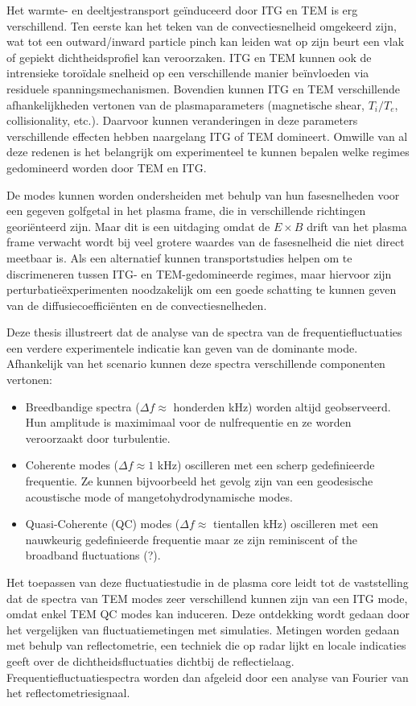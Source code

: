 Het warmte- en deeltjestransport geïnduceerd door ITG en TEM is erg verschillend. Ten eerste kan het teken van de convectiesnelheid omgekeerd zijn, wat tot een outward/inward particle pinch kan leiden wat op zijn beurt een vlak of gepiekt dichtheidsprofiel kan veroorzaken. ITG en TEM kunnen ook de intrensieke toroïdale snelheid op een verschillende manier beïnvloeden via residuele spanningsmechanismen. Bovendien kunnen ITG en TEM verschillende afhankelijkheden vertonen van de plasmaparameters (magnetische shear, $T_i/T_e$, collisionality, etc.). Daarvoor kunnen veranderingen in deze parameters verschillende effecten hebben naargelang ITG of TEM domineert. Omwille van al deze redenen is het belangrijk om experimenteel te kunnen bepalen welke regimes gedomineerd worden door TEM en ITG.

De modes kunnen worden ondersheiden met behulp van hun fasesnelheden voor een gegeven golfgetal in het plasma frame, die in verschillende richtingen georiënteerd zijn. Maar dit is een uitdaging omdat de $E\times B$ drift van het plasma frame verwacht wordt bij veel grotere waardes van de fasesnelheid die niet direct meetbaar is. Als een alternatief kunnen transportstudies helpen om te discrimeneren tussen ITG- en TEM-gedomineerde regimes, maar hiervoor zijn perturbatieëxperimenten noodzakelijk om een goede schatting te kunnen geven van de diffusiecoefficiënten en de convectiesnelheden.

Deze thesis illustreert dat de analyse van de spectra van de frequentiefluctuaties een verdere experimentele indicatie kan geven van de dominante mode. Afhankelijk van het scenario kunnen deze spectra verschillende componenten vertonen:

\begin{itemize}
	\item Breedbandige spectra ($\Delta f\approx$ honderden kHz) worden altijd geobserveerd. Hun amplitude is maximimaal voor de nulfrequentie en ze worden veroorzaakt door turbulentie.
	\item Coherente modes ($\Delta f\approx1$ kHz) oscilleren met een scherp gedefinieerde frequentie. Ze kunnen bijvoorbeeld het gevolg zijn van een geodesische acoustische mode of mangetohydrodynamische modes.
	\item Quasi-Coherente (QC) modes ($\Delta f\approx$ tientallen kHz) oscilleren met een nauwkeurig gedefinieerde frequentie maar ze zijn reminiscent of the broadband fluctuations (?).
\end{itemize}

Het toepassen van deze fluctuatiestudie in de plasma core leidt tot de vaststelling dat de spectra van TEM modes zeer verschillend kunnen zijn van een ITG mode, omdat enkel TEM QC modes kan induceren. Deze ontdekking wordt gedaan door het vergelijken van fluctuatiemetingen met simulaties. Metingen worden gedaan met behulp van reflectometrie, een techniek die op radar lijkt en locale indicaties geeft over de dichtheidsfluctuaties dichtbij de reflectielaag. Frequentiefluctuatiespectra worden dan afgeleid door een analyse van Fourier van het reflectometriesignaal.

